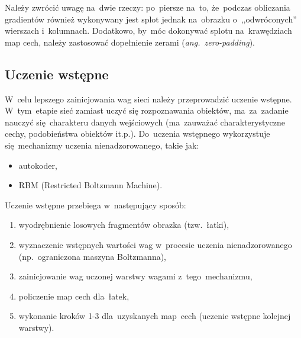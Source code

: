 Należy zwrócić uwagę na~dwie rzeczy: po~piersze na~to, że~podczas obliczania gradientów również wykonywany
jest splot jednak na~obrazku o~,,odwróconych'' wierszach i~kolumnach. Dodatkowo, by~móc dokonywać splotu
na~krawędziach map cech, należy zastosować dopełnienie zerami (\textit{ang.~zero-padding}).

\subsection{Uczenie wstępne}
W~celu lepszego zainicjowania wag sieci należy przeprowadzić uczenie wstępne. W~tym~etapie sieć zamiast uczyć
się rozpoznawania obiektów, ma~za~zadanie nauczyć się~charakteru danych wejściowych (ma~zauważać
charakterystyczne cechy, podobieństwa obiektów it.p.). Do~uczenia wstępnego wykorzystuje się~mechanizmy
uczenia nienadzorowanego, takie jak:
\begin{itemize}
  \item autokoder,
  \item RBM (Restricted Boltzmann Machine).
\end{itemize}

Uczenie wstępne przebiega w~następujący sposób:
\begin{enumerate}
  \item wyodrębnienie losowych fragmentów obrazka (tzw.~łatki),
  \item wyznaczenie wstępnych wartości wag w~procesie uczenia nienadzorowanego (np.~ograniczona maszyna Boltzmanna),
  \item zainicjowanie wag uczonej warstwy wagami z~tego~mechanizmu,
  \item policzenie map cech dla~łatek,
  \item wykonanie kroków 1-3 dla~uzyskanych map~cech (uczenie wstępne kolejnej warstwy).
\end{enumerate}

